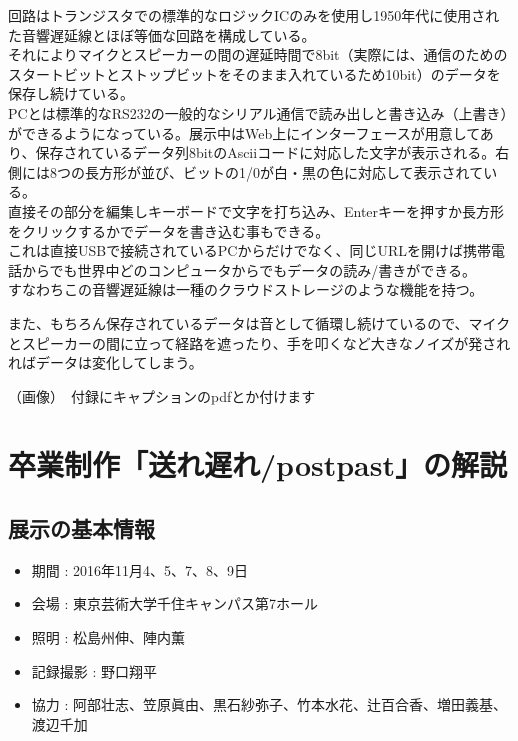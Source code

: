 \documentclass[a4paper,report]{jsbook}
\begin{document}
回路はトランジスタでの標準的なロジックICのみを使用し1950年代に使用された音響遅延線とほぼ等価な回路を構成している。\\
それによりマイクとスピーカーの間の遅延時間で8bit（実際には、通信のためのスタートビットとストップビットをそのまま入れているため10bit）のデータを保存し続けている。\\
PCとは標準的なRS232の一般的なシリアル通信で読み出しと書き込み（上書き）ができるようになっている。展示中はWeb上にインターフェースが用意してあり、保存されているデータ列8bitのAsciiコードに対応した文字が表示される。右側には8つの長方形が並び、ビットの1/0が白・黒の色に対応して表示されている。\\
直接その部分を編集しキーボードで文字を打ち込み、Enterキーを押すか長方形をクリックするかでデータを書き込む事もできる。\\
これは直接USBで接続されているPCからだけでなく、同じURLを開けば携帯電話からでも世界中どのコンピュータからでもデータの読み/書きができる。\\
すなわちこの音響遅延線は一種のクラウドストレージのような機能を持つ。

また、もちろん保存されているデータは音として循環し続けているので、マイクとスピーカーの間に立って経路を遮ったり、手を叩くなど大きなノイズが発されればデータは変化してしまう。

（画像）　付録にキャプションのpdfとか付けます

\section{卒業制作「送れ\textbar{}遅れ/post\textbar{}past」の解説}\label{ux5352ux696dux5236ux4f5cux9001ux308cux9045ux308cpostpastux306eux89e3ux8aac}

\subsection{展示の基本情報}\label{ux5c55ux793aux306eux57faux672cux60c5ux5831-1}

\begin{itemize}
\tightlist
\item
  期間 : 2016年11月4、5、7、8、9日
\item
  会場 : 東京芸術大学千住キャンパス第7ホール
\item
  照明 : 松島州伸、陣内薫
\item
  記録撮影 : 野口翔平
\item
  協力 :
  阿部壮志、笠原眞由、黒石紗弥子、竹本水花、辻百合香、増田義基、渡辺千加
\end{itemize}
\end{document}

